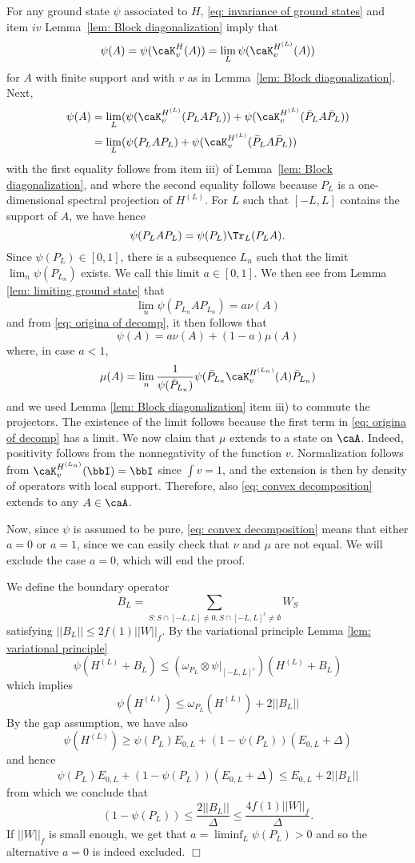For any ground state $\psi$ associated to $H$, \eqref{eq: invariance of ground states} and item $iv$ Lemma~\ref{lem: Block diagonalization} imply that
$$
\psi(A)=  \psi(\caK_v^H(A)) = \lim_L \psi(\caK_v^{H^{(L)}}(A))
$$
for $A$ with finite support and
with  $v$ as in Lemma~\ref{lem: Block diagonalization}.
Next,
\begin{align}
	\psi(A) &=  \lim_L ( \psi(\caK_v^{H^{(L)}}(P_LAP_L)) +  \psi(\caK_v^{H^{(L)}}(\bar P_L A\bar P_L)) 
	\\
	&=  \lim_L ( \psi(P_LAP_L) +  \psi(\caK_v^{H^{(L)}}(\bar P_L A\bar P_L))  \label{eq: origina of decomp}
\end{align}
with the first equality follows from item iii) of Lemma~\ref{lem: Block diagonalization}, and
where the second equality follows because $P_L$ is a one-dimensional spectral projection of $H^{(L)}$. 
For $L$ such that $[-L,L]$ contains the support of $A$, we have hence
$$
\psi(P_LAP_L)= \psi(P_L) \Tr_L(P_LA).
$$
Since $\psi(P_L) \in [0,1]$, there is a subsequence $L_n$ such that the limit $\lim_n\psi(P_{L_n})$ exists. We call this limit $a \in [0,1]$.
We then see from Lemma \ref{lem: limiting ground state} that
$$
\lim_n \psi(P_{L_n}AP_{L_n}) = a \nu(A)
$$
and from \eqref{eq: origina of decomp}, it then follows that 
\begin{equation}\label{eq: convex decomposition}
	\psi(A)= a \nu(A) +(1-a)\mu(A)
\end{equation}
where, in case $ a < 1$,  
$$
\mu(A)=\lim_n    \frac{1}{\psi(\bar{P}_{L_n})}  \psi(\bar{P}_{L_n}\caK_v^{H^{(L_n)}}(A)\bar{P}_{L_n})
$$
and we used Lemma \ref{lem: Block diagonalization} item iii) to commute the projectors. The existence of the limit follows because the first term in \eqref{eq: origina of decomp} has a limit.  
We now claim that $\mu$ extends to a state on $\caA$. Indeed, positivity follows from the nonnegativity of the function $v$. Normalization follows from $\caK_v^{H^{(L_n)}}(\bbI) = \bbI$ since $\int v = 1$, and the extension is then by density of operators with local support. Therefore, also \eqref{eq: convex decomposition} extends to any $A\in \caA$. 



Now, since $\psi$ is assumed to be pure, \eqref{eq: convex decomposition} means that either $a=0$ or $a=1$, since we can easily check that $\nu$ and $\mu$ are not equal. We will exclude the case $a=0$, which will end the proof.  

We define the boundary operator
$$
B_L= \sum_{S: S \cap [-L,L]\neq 0, S \cap [-L,L]^c \neq \emptyset}  W_S
$$
satisfying $||B_L|| \leq 2f(1) ||W||_f$. By the variational principle Lemma \ref{lem: variational principle}
$$
\psi(H^{(L)}+B_L) \leq (\omega_{P_L}\otimes\psi|_{[-L,L]^c})(H^{(L)}+B_L)
$$
which implies 
$$
\psi(H^{(L)}) \leq \omega_{P_L}(H^{(L)}) + 2||B_L||  
$$
By the gap assumption, we have 
also
$$
\psi(H^{(L)}) \geq \psi(P_L) E_{0,L}+ (1-\psi(P_L)) (E_{0,L} +\Delta)    
$$
and hence
$$
\psi(P_L) E_{0,L}+ (1-\psi(P_L)) (E_{0,L} +\Delta) \leq  E_{0,L} + 2||B_L|| 
$$
from which we conclude that
$$
(1-\psi(P_L))   \leq  \frac{2||B_L|| }{\Delta} \leq  \frac{4 f(1) ||W||_f  }{\Delta}.
$$
If $||W||_f$ is small enough, we get that $a = \liminf_L\psi(P_L)>0$ and so the alternative $a=0$ is indeed excluded. \hfill $\Box$

\cleardoublepage

